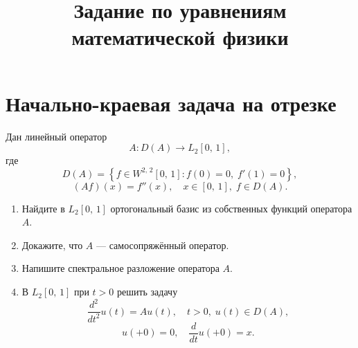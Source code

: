 \documentclass[a4paper]{article}
\title{Задание по уравнениям математической физики}
\begin{document}
	\maketitle
\tableofcontents 
\section{Начально-краевая задача на отрезке}
\begin{hiProb}[№12]
	Дан линейный оператор
	\[
		A \colon  D(A) \to L_2 [0,\,1]
	,\] 
	где
	\[
		D(A)= \left\{ f \in  W^{2,\,2}[0,\,1]:
		f(0)=0,\; f'(1)=0\right\} 
	,\] 
	\[
		(Af)(x)=f''(x),\quad x \in  [0,\,1],\; f \in D(A)
	.\] 
	\begin{enumerate}
		\item Найдите в $L_2 [0,\,1]$ ортогональный базис
			из собственных функций оператора $A$.
		\item Докажите, что $A$ --- самосопряжённый
			оператор.
		\item Напишите спектральное разложение оператора
			$A$.
		\item В $L_2[0,\,1]$ при $t>0$ решить задачу
		\[
			\frac{d^2}{dt^2} u(t)= A u(t),
			\quad t>0,\; u(t) \in D(A),
		\]
		\[
			u(+0)=0,\quad \frac{d}{dt}u(+0)=x
		.\] 
	\end{enumerate}
\end{hiProb}
\end{document}
